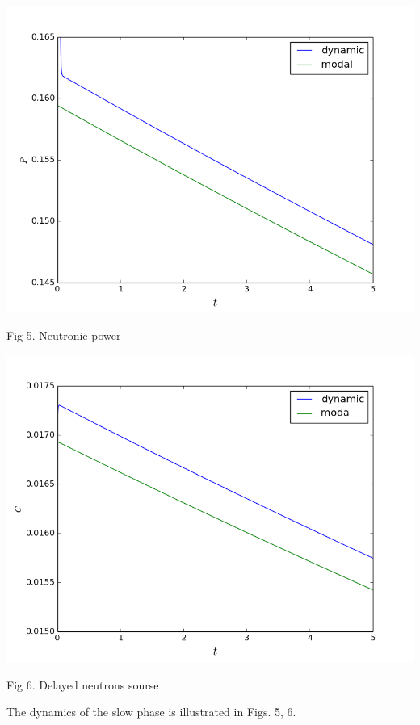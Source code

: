 \documentclass[landscape,a1paper,fontscale=0.5]{poster}
\begin{document}
\begin{poster}
{\begin{minipage}{0.5\textwidth}
\includegraphics[width=1\linewidth] {17.png}
\begin{center}
Fig 5. Neutronic power
\end{center}
\end{minipage}
\begin{minipage}{0.5\textwidth}
\includegraphics[width=1\linewidth] {18.png}
\begin{center}
Fig 6. Delayed neutrons sourse
\end{center}
\end{minipage}

\vspace{0.5em}
The dynamics of the slow phase is illustrated in Figs. 5, 6.
}


\end{poster}
\end{document}
